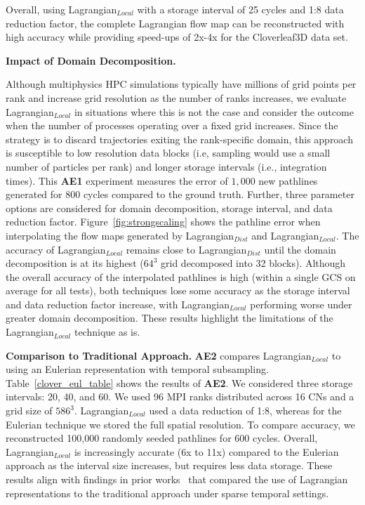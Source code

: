 



Overall, using Lagrangian$_{Local}$ with a storage interval of 25 cycles and 1:8 data reduction factor, the complete Lagrangian flow map can be reconstructed with high accuracy while providing speed-ups of 2x-4x for the Cloverleaf3D data set.

\textbf{Impact of Domain Decomposition.}
%

%
Although multiphysics HPC simulations typically have millions of grid points per rank and increase grid resolution as the number of ranks increases, we evaluate Lagrangian$_{Local}$ in situations where this is not the case and consider the outcome when the number of processes operating over a fixed grid increases.
%
%
Since the strategy is to discard trajectories exiting the rank-specific domain, this approach is susceptible to low resolution data blocks (i.e, sampling would use a small number of particles per rank) and longer storage intervals (i.e., integration times).
%
This \textbf{AE1} experiment measures the error of $1,000$ new pathlines generated for 800 cycles compared to the ground truth. 
%
Further, three parameter options are considered for domain decomposition, storage interval, and data reduction factor. 
%
Figure~\ref{fig:strongscaling} shows the pathline error when interpolating the flow maps generated by Lagrangian$_{Dist}$ and Lagrangian$_{Local}$. 
%
The accuracy of Lagrangian$_{Local}$ remains close to Lagrangian$_{Dist}$ until the domain decomposition is at its highest ($64^{3}$ grid decomposed into 32 blocks).
%
%
Although the overall accuracy of the interpolated pathlines is high (within a single GCS on average for all tests), both techniques lose some accuracy as the storage interval and data reduction factor increase, with Lagrangian$_{Local}$ performing worse under greater domain decomposition.
%
These results highlight the limitations of the Lagrangian$_{Local}$ technique as is.
%


\textbf{Comparison to Traditional Approach.}
\textbf{AE2} compares Lagrangian$_{Local}$ to using an Eulerian representation with temporal subsampling.
%
Table~\ref{clover_eul_table} shows the results of \textbf{AE2}.
%
We considered three storage intervals: 20, 40, and 60.
%
We used 96 MPI ranks distributed across 16 CNs and a grid size of $586^3$.
%
Lagrangian$_{Local}$ used a data reduction of 1:8, whereas for the Eulerian technique we stored the full spatial resolution.
%
To compare accuracy, we reconstructed 100,000 randomly seeded pathlines for 600 cycles.
%
%
Overall, Lagrangian$_{Local}$ is increasingly accurate (6x to 11x) compared to the Eulerian approach as the interval size increases, but requires less data storage.
%
These results align with findings in prior works~\cite{agranovsky2014improved, sane2018revisiting} that compared the use of Lagrangian representations to the traditional approach under sparse temporal settings.


